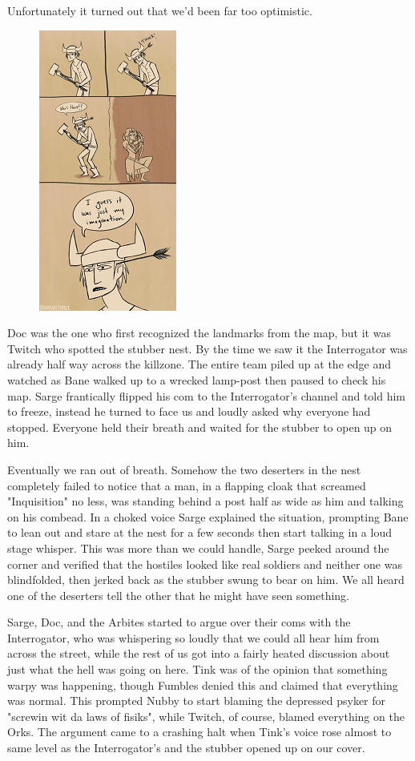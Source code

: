 Unfortunately it turned out that we'd been far too optimistic.

\begin{figure}
	\begin{center}
		\includegraphics[width=\figwidth]{pics/9/23.png}
	\end{center}
\end{figure}
Doc was the one who first recognized the landmarks from the map, but it was Twitch who spotted the stubber nest. 
By the time we saw it the Interrogator was already half way across the killzone. 
The entire team piled up at the edge and watched as Bane walked up to a wrecked lamp-post then paused to check his map. 
Sarge frantically flipped his com to the Interrogator's channel and told him to freeze, instead he turned to face us and loudly asked why everyone had stopped. 
Everyone held their breath and waited for the stubber to open up on him.

Eventually we ran out of breath. 
Somehow the two deserters in the nest completely failed to notice that a man, in a flapping cloak that screamed "Inquisition" no less, was standing behind a post half as wide as him and talking on his combead. 
In a choked voice Sarge explained the situation, prompting Bane to lean out and stare at the nest for a few seconds then start talking in a loud stage whisper. 
This was more than we could handle, Sarge peeked around the corner and verified that the hostiles looked like real soldiers and neither one was blindfolded, then jerked back as the stubber swung to bear on him. 
We all heard one of the deserters tell the other that he might have seen something.

Sarge, Doc, and the Arbites started to argue over their coms with the Interrogator, who was whispering so loudly that we could all hear him from across the street, while the rest of us got into a fairly heated discussion about just what the hell was going on here. 
Tink was of the opinion that something warpy was happening, though Fumbles denied this and claimed that everything was normal. 
This prompted Nubby to start blaming the depressed psyker for "screwin wit da laws of fisiks", while Twitch, of course, blamed everything on the Orks. 
The argument came to a crashing halt when Tink's voice rose almost to same level as the Interrogator's and the stubber opened up on our cover.

